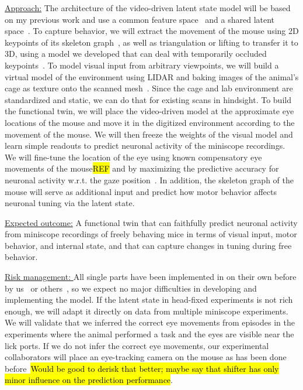 \documentclass[COG,11pt]{ercgrant}
\begin{document}
\underline{Approach:} 
The architecture of the video-driven latent state model will be based on my previous work and use a common feature space~\parencite{Sinz2018-sk} and a shared latent space~\parencite{Bashiri2021-or}. 
To capture behavior, we will extract the movement of the mouse using 2D keypoints of its skeleton graph~\parencite{Mathis2018-lk}, as well as triangulation or lifting to transfer it to 3D, using a model we developed that can deal with temporarily occluded keypoints~\parencite{Pierzchlewicz2022-tq}. 
To model visual input from arbitrary viewpoints, we will build a virtual model of the environment using LIDAR and baking images of the animal's cage as texture onto the scanned mesh~\parencite[similar as in][]{Holmgren2021-jv}. 
Since the cage and lab environment are standardized and static, we can do that for existing scans in hindsight.
To build the functional twin, we will place the video-driven model at the approximate eye locations of the mouse and move it in the digitized environment according to the movement of the mouse. 
We will then freeze the weights of the visual model and learn simple readouts to predict neuronal activity of the miniscope recordings.
We will fine-tune the location of the eye using known compensatory eye movements of the mouse\hl{REF} and by maximizing the predictive accuracy for neuronal activity w.r.t. the gaze position~\parencite[similar to][]{Sinz2018-sk, Parker2022-ac}.
In addition, the skeleton graph of the mouse will serve as additional input and predict how motor behavior affects neuronal tuning via the latent state. 

\underline{Expected outcome:} A functional twin that can faithfully predict neuronal activity from miniscope recordings of freely behaving mice in terms of visual input, motor behavior, and internal state, and that can capture changes in tuning during free behavior. 

\underline{Risk management: } All single parts have been implemented in on their own before by us~\parencite{Sinz2018-sk, Bashiri2021-or} or others~\parencite{Parker2022-ac,Holmgren2021-jv}, so we expect no major difficulties in developing and implementing the model. If the latent state in head-fixed experiments is not rich enough, we will adapt it directly on data from multiple miniscope experiments. We will validate that we inferred the correct eye movements from episodes in the experiments where the animal performed a task and the eyes are visible near the lick ports. If we do not infer the correct eye movements, our experimental collaborators will place an eye-tracking camera on the mouse as has been done before~\parencite{Parker2022-ac}\hl{Would be good to derisk that better; maybe say that shifter has only minor influence on the prediction performance}.
\end{document}
